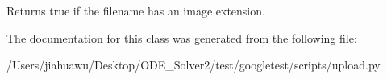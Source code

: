 \begin{DoxyVerb}Returns true if the filename has an image extension.\end{DoxyVerb}
 

The documentation for this class was generated from the following file\+:\begin{DoxyCompactItemize}
\item 
/\+Users/jiahuawu/\+Desktop/\+O\+D\+E\+\_\+\+Solver2/test/googletest/scripts/upload.\+py\end{DoxyCompactItemize}
